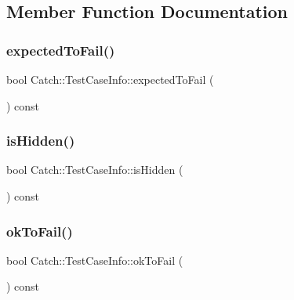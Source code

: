 \subsection{Member Function Documentation}
\hypertarget{struct_catch_1_1_test_case_info_abe33d81233230cdae8afa714688e905b}{}\label{struct_catch_1_1_test_case_info_abe33d81233230cdae8afa714688e905b} 
\subsubsection{\texorpdfstring{expected\+To\+Fail()}{expectedToFail()}}
{\footnotesize\ttfamily bool Catch\+::\+Test\+Case\+Info\+::expected\+To\+Fail (\begin{DoxyParamCaption}{ }\end{DoxyParamCaption}) const}

\hypertarget{struct_catch_1_1_test_case_info_a934b1a0952700743e99d62ec1731a2e2}{}\label{struct_catch_1_1_test_case_info_a934b1a0952700743e99d62ec1731a2e2} 
\subsubsection{\texorpdfstring{is\+Hidden()}{isHidden()}}
{\footnotesize\ttfamily bool Catch\+::\+Test\+Case\+Info\+::is\+Hidden (\begin{DoxyParamCaption}{ }\end{DoxyParamCaption}) const}

\hypertarget{struct_catch_1_1_test_case_info_a5f37291295e3a6de2dd85324c941edaf}{}\label{struct_catch_1_1_test_case_info_a5f37291295e3a6de2dd85324c941edaf} 
\subsubsection{\texorpdfstring{ok\+To\+Fail()}{okToFail()}}
{\footnotesize\ttfamily bool Catch\+::\+Test\+Case\+Info\+::ok\+To\+Fail (\begin{DoxyParamCaption}{ }\end{DoxyParamCaption}) const}

